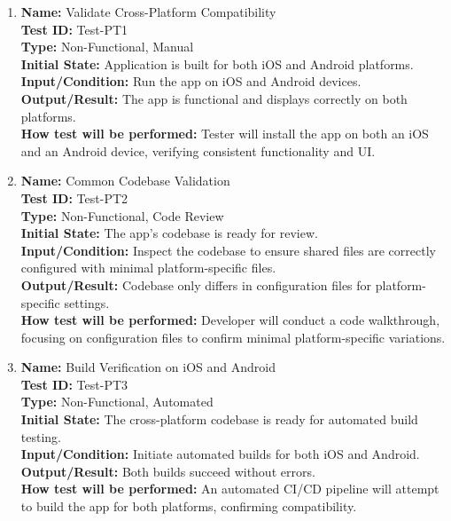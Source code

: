 \documentclass[12pt, titlepage]{article}
\begin{document}
\begin{enumerate}

    \item \textbf{Name:} Validate Cross-Platform Compatibility \label{itm:Test-PT1} \\
    \textbf{Test ID:} Test-PT1 \\
    \textbf{Type:} Non-Functional, Manual \\
    \textbf{Initial State:} Application is built for both iOS and Android platforms. \\
    \textbf{Input/Condition:} Run the app on iOS and Android devices. \\
    \textbf{Output/Result:} The app is functional and displays correctly on both platforms. \\
    \textbf{How test will be performed:} Tester will install the app on both an iOS and an Android device, verifying consistent functionality and UI.

    \item \textbf{Name:} Common Codebase Validation \label{itm:Test-PT2} \\
    \textbf{Test ID:} Test-PT2 \\
    \textbf{Type:} Non-Functional, Code Review \\
    \textbf{Initial State:} The app’s codebase is ready for review. \\
    \textbf{Input/Condition:} Inspect the codebase to ensure shared files are correctly configured with minimal platform-specific files. \\
    \textbf{Output/Result:} Codebase only differs in configuration files for platform-specific settings. \\
    \textbf{How test will be performed:} Developer will conduct a code walkthrough, focusing on configuration files to confirm minimal platform-specific variations.

    \item \textbf{Name:} Build Verification on iOS and Android \label{itm:Test-PT3} \\
    \textbf{Test ID:} Test-PT3 \\
    \textbf{Type:} Non-Functional, Automated \\
    \textbf{Initial State:} The cross-platform codebase is ready for automated build testing. \\
    \textbf{Input/Condition:} Initiate automated builds for both iOS and Android. \\
    \textbf{Output/Result:} Both builds succeed without errors. \\
    \textbf{How test will be performed:} An automated CI/CD pipeline will attempt to build the app for both platforms, confirming compatibility.

\end{enumerate}
\end{document}
